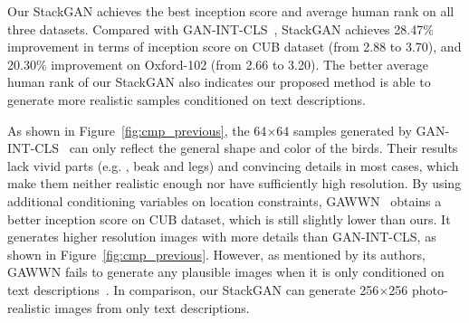 Our StackGAN achieves the best inception score and average human rank on all three datasets. Compared with GAN-INT-CLS~\cite{reed2016generative}, StackGAN achieves 28.47\% improvement in terms of inception score on CUB dataset (from 2.88 to 3.70), and 20.30\% improvement on Oxford-102 (from 2.66 to 3.20). The better average human rank of our StackGAN also indicates our proposed method is able to generate more realistic samples conditioned on text descriptions.

As shown in Figure~\ref{fig:cmp_previous}, the 64$\times$64 samples generated by GAN-INT-CLS~\cite{reed2016generative} can only reflect the general shape and color of the birds. Their results lack vivid parts (e.g. , beak and legs) and convincing details in most cases, which make them neither realistic enough nor have sufficiently high resolution. By using additional conditioning variables on location constraints, GAWWN~\cite{reed2016learning} obtains a better inception score on CUB dataset, which is still slightly lower than ours. It generates higher resolution images with more details than GAN-INT-CLS, as shown in Figure~\ref{fig:cmp_previous}. However, as mentioned by its authors, GAWWN fails to generate any plausible images when it is only conditioned on text descriptions~\cite{reed2016learning}. In comparison, our StackGAN can generate 256$\times$256 photo-realistic images from only text descriptions. 

